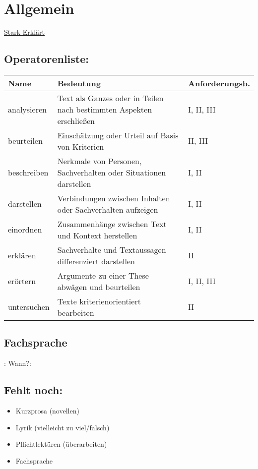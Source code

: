 
\section{Allgemein}


 \href{https://www.youtube.com/playlist?list=PLFQhWtJUIAq00wSOlfr-xGlOsD8IETL3G}{Stark Erklärt}

\subsection{Operatorenliste:}

\setlength{\tabcolsep}{4pt}

\renewcommand{\arraystretch}{1.3}
\begin{tabular}{|p{2cm}|p{6.7cm}|p{2.5cm}|}
    \hline
    Name & Bedeutung & Anforderungsb. \\
    \hline
    analysieren & Text als Ganzes oder in Teilen nach bestimmten Aspekten erschließen & I, II, III \\
    \hline
    beurteilen & Einschätzung oder Urteil auf Basis von Kriterien & II, III \\
    \hline
    beschreiben & Nerkmale von Personen, Sachverhalten oder Situationen darstellen & I, II \\
    \hline
    darstellen & Verbindungen zwischen Inhalten oder Sachverhalten aufzeigen & I, II \\
    \hline 
    einordnen & Zusammenhänge zwischen Text und Kontext herstellen & I, II \\
    \hline
    erklären & Sachverhalte und Textaussagen differenziert darstellen & II \\
    \hline
    erörtern & Argumente zu einer These abwägen und beurteilen & I, II, III \\
    \hline 
    untersuchen & Texte kriterienorientiert bearbeiten & II \\
    \hline
\end{tabular}

\subsection{Fachsprache}
: Wann?: 


\subsection{Fehlt noch:}
\begin{itemize}
    \item Kurzprosa (novellen)
    \item Lyrik (vielleicht zu viel/falsch)
    \item Pflichtlektüren (überarbeiten)
    \item Fachsprache
\end{itemize}


